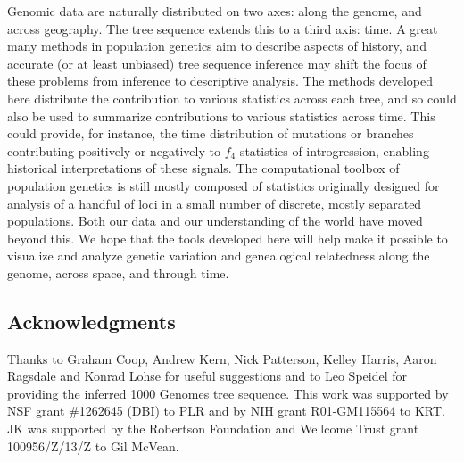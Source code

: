 \documentclass{article}
\begin{document}
Genomic data are naturally distributed on two axes: along the genome, and across geography.
The tree sequence extends this to a third axis: time.
A great many methods in population genetics aim to describe aspects of history,
and accurate (or at least unbiased) tree sequence inference
may shift the focus of these problems from inference to descriptive analysis.
The methods developed here distribute the contribution to various statistics across each tree,
and so could also be used to summarize contributions to various statistics across time.
This could provide, for instance, the time distribution of mutations or branches
contributing positively or negatively to $f_4$ statistics of introgression,
enabling historical interpretations of these signals.
The computational toolbox of population genetics
is still mostly composed of statistics originally designed for analysis of a handful of loci
in a small number of discrete, mostly separated populations.
Both our data and our understanding of the world have moved beyond this.
We hope that the tools developed here will help make it possible
to visualize and analyze genetic variation and genealogical relatedness
along the genome, across space, and through time.






\subsection*{Acknowledgments}
Thanks to Graham Coop, Andrew Kern, Nick Patterson, Kelley Harris,
Aaron Ragsdale and Konrad Lohse for useful suggestions
and to Leo Speidel for providing the inferred 1000 Genomes tree sequence.
This work was supported by NSF grant \#1262645 (DBI) to PLR
and by NIH grant R01-GM115564 to KRT. JK was supported by
the Robertson Foundation and Wellcome Trust grant 100956/Z/13/Z
to Gil McVean.
\end{document}
